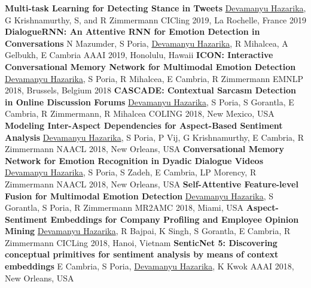 \begin{cvpublications}
  \cvpublication
    {\textbf{Multi-task Learning for Detecting Stance in Tweets}}  %
    {\underline{Devamanyu Hazarika}, G Krishnamurthy, S, and R Zimmermann} %
    {CICling 2019, La Rochelle, France} %
    {2019} %
  \cvpublication
    {\textbf{DialogueRNN: An Attentive RNN for Emotion Detection in Conversations}}  %
    {N Mazumder, S Poria, \underline{Devamanyu Hazarika}, R Mihalcea, A Gelbukh, E Cambria} %
    {AAAI 2019, Honolulu, Hawaii} %
    {} %
  \cvpublication
    {\textbf{ICON: Interactive Conversational Memory Network for Multimodal Emotion Detection}}  %
    {\underline{Devamanyu Hazarika}, S Poria, R Mihalcea, E Cambria, R Zimmermann} %
    {EMNLP 2018, Brussels, Belgium} %
    {2018} %
  \cvpublication
    {\textbf{CASCADE: Contextual Sarcasm Detection in Online Discussion Forums}} %
    {\underline{Devamanyu Hazarika}, S Poria, S Gorantla, E Cambria, R Zimmermann, R Mihalcea} %
    {COLING 2018, New Mexico, USA} %
    {} %
  \cvpublication
    {\textbf{Modeling Inter-Aspect Dependencies for Aspect-Based Sentiment Analysis}} %
    {\underline{Devamanyu Hazarika}, S Poria, P Vij, G Krishnamurthy,  E Cambria, R Zimmermann} %
    {NAACL 2018, New Orleans, USA} %
    {} %
  \cvpublication
    {\textbf{Conversational Memory Network for Emotion Recognition in Dyadic Dialogue Videos}} %
    {\underline{Devamanyu Hazarika}, S Poria, S Zadeh, E Cambria, LP Morency, R Zimmermann} %
    {NAACL 2018, New Orleans, USA} %
    {} %
  \cvpublication
    {\textbf{Self-Attentive Feature-level Fusion for Multimodal Emotion Detection}} %
    {\underline{Devamanyu Hazarika}, S Gorantla, S Poria, R Zimmermann} %
    {MR2AMC 2018, Miami, USA} %
    {} %
  \cvpublication
    {\textbf{Aspect-Sentiment Embeddings for Company Profiling and Employee Opinion Mining}} %
    {\underline{Devamanyu Hazarika}, R Bajpai, K Singh, S Gorantla, E Cambria, R Zimmermann} %
    {CICLing 2018, Hanoi, Vietnam} %
    {} %
  \cvpublication
    {\textbf{SenticNet 5: Discovering conceptual primitives for sentiment analysis by means of context embeddings}} %
    {E Cambria, S Poria, \underline{Devamanyu Hazarika}, K Kwok} %
    {AAAI 2018, New Orleans, USA} %
    {} %
\end{cvpublications}
